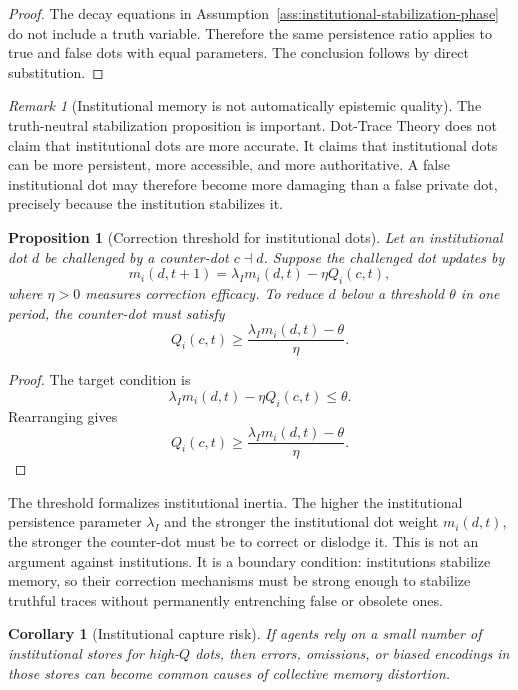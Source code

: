 \documentclass[11pt]{article}
\newtheorem{proposition}{Proposition}
\newtheorem{corollary}{Corollary}
\theoremstyle{remark}
\newtheorem{remark}{Remark}
\begin{document}
\begin{proof}
The decay equations in Assumption~\ref{ass:institutional-stabilization-phase}
do not include a truth variable. Therefore the same persistence ratio
applies to true and false dots with equal parameters. The conclusion
follows by direct substitution.
\end{proof}

\begin{remark}[Institutional memory is not automatically epistemic quality]
The truth-neutral stabilization proposition is important. Dot-Trace
Theory does not claim that institutional dots are more accurate. It
claims that institutional dots can be more persistent, more accessible,
and more authoritative. A false institutional dot may therefore become
more damaging than a false private dot, precisely because the
institution stabilizes it.
\end{remark}

\begin{proposition}[Correction threshold for institutional dots]\label{prop:institutional-correction-threshold}
Let an institutional dot $d$ be challenged by a counter-dot $c\dashv d$.
Suppose the challenged dot updates by
$$
m_i(d,t+1)=\lambda_I m_i(d,t)-\eta Q_i(c,t),
$$
where $\eta>0$ measures correction efficacy. To reduce $d$ below a
threshold $\theta$ in one period, the counter-dot must satisfy
$$
Q_i(c,t)\geq \frac{\lambda_I m_i(d,t)-\theta}{\eta}.
$$
\end{proposition}

\begin{proof}
The target condition is
$$
\lambda_I m_i(d,t)-\eta Q_i(c,t)\leq \theta.
$$
Rearranging gives
$$
Q_i(c,t)\geq \frac{\lambda_I m_i(d,t)-\theta}{\eta}.
$$
\end{proof}

The threshold formalizes institutional inertia. The higher the
institutional persistence parameter $\lambda_I$ and the stronger the
institutional dot weight $m_i(d,t)$, the stronger the counter-dot must
be to correct or dislodge it. This is not an argument against
institutions. It is a boundary condition: institutions stabilize memory,
so their correction mechanisms must be strong enough to stabilize
truthful traces without permanently entrenching false or obsolete ones.

\begin{corollary}[Institutional capture risk]\label{cor:institutional-capture-risk}
If agents rely on a small number of institutional stores for high-$Q$
dots, then errors, omissions, or biased encodings in those stores can
become common causes of collective memory distortion.
\end{corollary}
\end{document}
